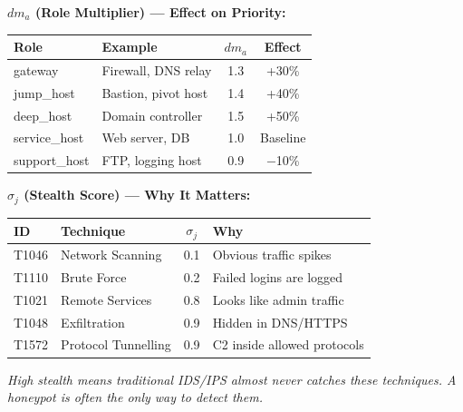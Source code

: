 \documentclass[journal]{IEEEtran}
\begin{document}
\begin{examplebox}
\textbf{$dm_a$ (Role Multiplier) --- Effect on Priority:}
\begin{center}
\small
\renewcommand{\arraystretch}{1.1}
\begin{tabular}{@{}llcc@{}}
\toprule
\textbf{Role} & \textbf{Example} & $dm_a$ & \textbf{Effect} \\
\midrule
gateway      & Firewall, DNS relay & 1.3 & +30\% \\
jump\_host   & Bastion, pivot host & 1.4 & +40\% \\
deep\_host   & Domain controller   & 1.5 & +50\% \\
service\_host& Web server, DB      & 1.0 & Baseline \\
support\_host& FTP, logging host   & 0.9 & $-$10\% \\
\bottomrule
\end{tabular}
\end{center}
\end{examplebox}

\begin{examplebox}
\textbf{$\sigma_j$ (Stealth Score) --- Why It Matters:}
\begin{center}
\small
\renewcommand{\arraystretch}{1.1}
\begin{tabular}{@{}llcl@{}}
\toprule
\textbf{ID} & \textbf{Technique} & $\sigma_j$ & \textbf{Why} \\
\midrule
T1046 & Network Scanning    & 0.1 & Obvious traffic spikes \\
T1110 & Brute Force         & 0.2 & Failed logins are logged \\
T1021 & Remote Services     & 0.8 & Looks like admin traffic \\
T1048 & Exfiltration        & 0.9 & Hidden in DNS/HTTPS \\
T1572 & Protocol Tunnelling & 0.9 & C2 inside allowed protocols \\
\bottomrule
\end{tabular}
\end{center}
\textit{High stealth means traditional IDS/IPS almost never
catches these techniques.
A honeypot is often the \emph{only} way to detect them.}
\end{examplebox}
\end{document}
